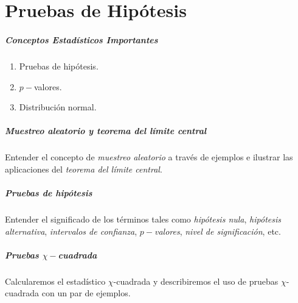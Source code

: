 \chapter{Pruebas de Hipótesis}

% 

\paragraph{Conceptos Estadísticos Importantes}
 \begin{enumerate}
  \item Pruebas de hipótesis.
  \item $p-$valores.
  \item Distribución normal.
 \end{enumerate}


\paragraph{Muestreo aleatorio y teorema del límite central}
 Entender el concepto de \emph{muestreo aleatorio} a través de ejemplos e ilustrar las aplicaciones del \emph{teorema del límite central}. 



\paragraph{Pruebas de hipótesis}
 Entender el significado de los términos tales como \emph{hipótesis nula}, \emph{hipótesis alternativa}, \emph{intervalos de confianza}, \emph{$p-$valores}, \emph{nivel de significación}, etc.

\paragraph{Pruebas $\chi-$cuadrada}
 Calcularemos el estadístico $\chi$-cuadrada y describiremos el uso de pruebas $\chi$-cuadrada con un par de ejemplos.

% 

